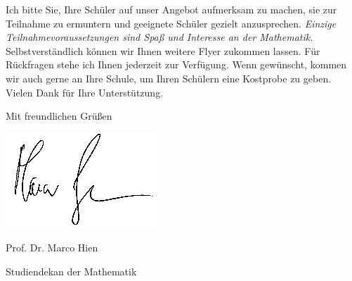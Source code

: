 \documentclass{zirkelbrief}
\begin{document}
Ich bitte Sie, Ihre Schüler auf unser Angebot aufmerksam zu machen, sie zur
Teilnahme zu ermuntern und geeignete Schüler gezielt
anzusprechen. \emph{Einzige Teilnahmevoraussetzungen sind Spaß und
Interesse an der Mathematik.} Selbstverständlich können wir Ihnen weitere Flyer
zukommen lassen. Für Rückfragen stehe ich Ihnen jederzeit zur Verfügung. Wenn gewünscht, kommen wir auch
gerne an Ihre Schule, um Ihren Schülern eine Kostprobe zu geben. Vielen Dank für Ihre
Unterstützung.

Mit freundlichen Grüßen
\vspace{0.1cm}

\hspace{1cm} \includegraphics[scale=0.3]{unterschrift_marco_hien}

\vspace{-0.2cm}

Prof. Dr. Marco Hien

\vspace{-0.2cm}

{\small Studiendekan der Mathematik}
\end{document}
